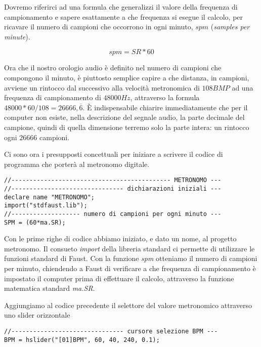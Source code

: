 Dovremo riferirci ad una formula che generalizzi il valore della frequenza di campionamento
e sapere esattamente a che frequenza si esegue il calcolo, per ricavare il numero
di campioni che occorrono in ogni minuto, $spm$ (\emph{samples per minute}).

\begin{equation}
spm = SR*60
\end{equation}

Ora che il nostro orologio audio è definito nel numero di campioni che compongono
il minuto, è piuttosto semplice capire a che distanza, in campioni, avviene un
rintocco dal successivo alla velocità metronomica di $108BMP$ ad una frequenza
di campionamento di $48000Hz$, attraverso la formula $48000*60/108=26666,\overline{6}$.
È indispensabile chiarire immediatamente che per il computer non esiste, nella
descrizione del segnale audio, la parte decimale del campione, quindi di quella
dimensione terremo solo la parte intera: un rintocco ogni $26666$ campioni.

Ci sono ora i presupposti concettuali per iniziare a scrivere il codice di programma
che porterà al metronomo digitale.

\begin{lstlisting}
//-------------------------------------------- METRONOMO ---
//------------------------------- dichiarazioni iniziali ---
declare name "METRONOMO";
import("stdfaust.lib");
//------------------- numero di campioni per ogni minuto ---
SPM = (60*ma.SR);
\end{lstlisting}

Con le prime righe di codice abbiamo iniziato, e dato un nome, al progetto metronomo.
Il consueto \emph{import} della libreria standard ci permette di utilizzare
le funzioni standard di Faust. Con la funzione \emph{spm} otteniamo il numero di
campioni per minuto, chiendendo a Faust di verificare a che frequenza di campionamento
è impostato il computer prima di effettuare il calcolo, attraverso la funzione
matematica standard \emph{ma.SR}.

Aggiungiamo al codice precedente il selettore del valore metronomico attraverso
uno slider orizzontale

\begin{lstlisting}
//------------------------------- cursore selezione BPM ---
BPM = hslider("[01]BPM", 60, 40, 240, 0.1);
\end{lstlisting}

